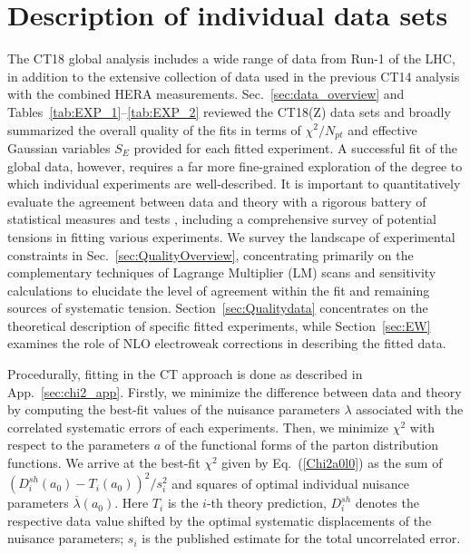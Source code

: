 \section{Description of individual data sets}
\label{sec:Quality}

The CT18 global analysis includes a wide range of data from Run-1 of the LHC, in addition to the extensive collection of data used in the previous CT14 analysis with the combined HERA measurements.
Sec.~\ref{sec:data_overview} and Tables~\ref{tab:EXP_1}--\ref{tab:EXP_2}
reviewed the CT18(Z) data sets and broadly summarized the overall
quality of the fits in terms of $\chi^2/N_\mathit{pt}$ and effective Gaussian
variables $S_E$ provided for each fitted experiment.
A successful fit of the global data, however, requires a far more fine-grained exploration of the degree to which individual experiments are well-described.
It is important to quantitatively evaluate the agreement between data and theory with a rigorous battery of statistical measures and tests \cite{Kovarik:2019xvh}, including a
comprehensive survey of potential tensions in fitting various
experiments. We survey the landscape of experimental constraints
in Sec.~\ref{sec:QualityOverview}, concentrating
primarily on the complementary techniques of Lagrange Multiplier (LM)
scans and sensitivity calculations to elucidate the level of agreement
within the fit and remaining sources of systematic
tension. Section~\ref{sec:Qualitydata} concentrates on the theoretical
description of specific fitted experiments, while Section~\ref{sec:EW}
examines the role of NLO electroweak corrections in describing the
fitted data. 

Procedurally, fitting in the CT approach is done as described in App.~\ref{sec:chi2_app}. Firstly, we minimize the difference between data and theory by computing the best-fit values of the nuisance parameters $\lambda$ associated with the correlated systematic errors of each experiments. Then, we minimize $\chi^{2}$ with respect to the parameters $a$ of the functional forms of the parton distribution functions. We arrive at the best-fit  $\chi^{2}$  given by Eq.~(\ref{Chi2a0l0}) as the sum of $(D^\mathit{sh}_{i}(a_0)-T_{i}(a_0))^{2}/s_{i}^{2}$ and squares of optimal individual nuisance parameters $\overline \lambda (a_0)$. Here $T_i$ is the $i$-th theory prediction, $D^\mathit{sh}_{i}$ denotes the respective data value shifted by the optimal systematic displacements of the nuisance parameters; $s_{i}$ is the published estimate for the total uncorrelated error.

